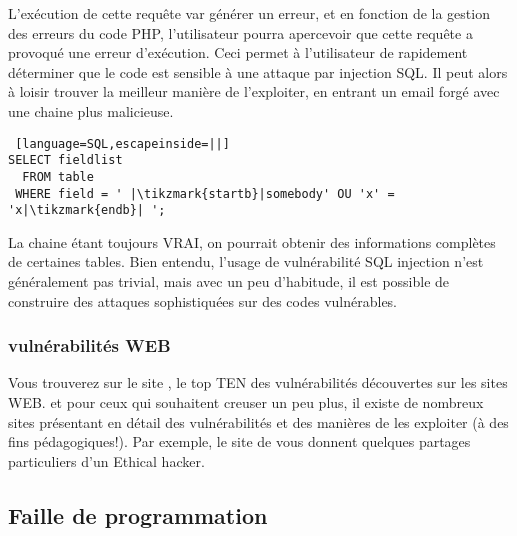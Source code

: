 L'exécution de cette requête var générer un erreur, et en fonction de la gestion des erreurs du code PHP, l'utilisateur pourra apercevoir que cette requête a provoqué une erreur d'exécution. Ceci permet à l'utilisateur de rapidement déterminer que le code est sensible à une attaque par injection SQL. Il peut alors à loisir trouver la meilleur manière de l'exploiter, en entrant un email forgé avec une chaine plus malicieuse.\\
\begin{lstlisting} [language=SQL,escapeinside=||]
SELECT fieldlist
  FROM table 
 WHERE field = ' |\tikzmark{startb}|somebody' OU 'x' = 'x|\tikzmark{endb}| ';
\end{lstlisting}
La chaine étant toujours VRAI, on pourrait obtenir des informations complètes de certaines tables.
Bien entendu, l'usage de vulnérabilité SQL injection n'est généralement pas trivial, mais avec un peu d'habitude, il est possible de construire des attaques sophistiquées sur des codes vulnérables.

\subsubsection{vulnérabilités WEB}

Vous trouverez sur le site , le top TEN des vulnérabilités découvertes sur les sites WEB.
et pour ceux qui souhaitent creuser un peu plus, il existe de nombreux sites présentant en détail des vulnérabilités et des manières de les exploiter (à des fins pédagogiques!). Par exemple, le site de  vous donnent quelques partages particuliers d'un Ethical hacker.


\subsection{Faille de programmation}

